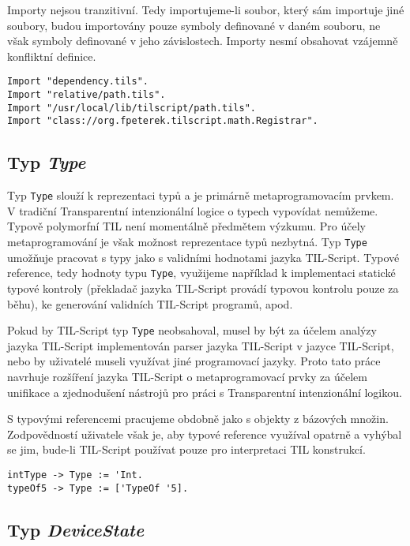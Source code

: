 Importy nejsou tranzitivní. Tedy importujeme-li soubor, který sám importuje jiné soubory, budou
importovány pouze symboly definované v daném souboru, ne však symboly definované v jeho
závislostech. Importy nesmí obsahovat vzájemně konfliktní definice.

\begin{lstlisting}[caption={Příklad využití výrazů Import}]
Import "dependency.tils".
Import "relative/path.tils".
Import "/usr/local/lib/tilscript/path.tils".
Import "class://org.fpeterek.tilscript.math.Registrar".
\end{lstlisting}

\subsection{Typ \textit{Type}}

Typ \lstinline{Type} slouží k reprezentaci typů a je primárně metaprogramovacím prvkem. V tradiční
Transparentní intenzionální logice o typech vypovídat nemůžeme. Typově polymorfní TIL není
momentálně předmětem výzkumu. Pro účely metaprogramování je však možnost reprezentace typů
nezbytná. Typ \lstinline{Type} umožňuje pracovat s typy jako s validními hodnotami jazyka
TIL-Script. Typové reference, tedy hodnoty typu \lstinline{Type}, využijeme například
k implementaci statické typové kontroly (překladač jazyka TIL-Script provádí typovou kontrolu pouze
za běhu), ke generování validních TIL-Script programů, apod.

Pokud by TIL-Script typ \lstinline{Type} neobsahoval, musel by být za účelem analýzy jazyka
TIL-Script implementován parser jazyka TIL-Script v jazyce TIL-Script, nebo by uživatelé museli
využívat jiné programovací jazyky. Proto tato práce navrhuje rozšíření jazyka TIL-Script
o metaprogramovací prvky za účelem unifikace a zjednodušení nástrojů pro práci s Transparentní
intenzionální logikou.

S typovými referencemi pracujeme obdobně jako s objekty z bázových množin. Zodpovědností uživatele
však je, aby typové reference využíval opatrně a vyhýbal se jim, bude-li TIL-Script používat pouze
pro interpretaci TIL konstrukcí.

\begin{lstlisting}[caption={Příklad využití typových referencí}]
intType -> Type := 'Int.
typeOf5 -> Type := ['TypeOf '5].
\end{lstlisting}

\subsection{Typ \textit{DeviceState}}


